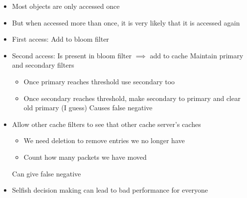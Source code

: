 \begin{itemize}
\begin{itemize}
\begin{itemize}
\begin{itemize}
\begin{itemize}
                                \end{itemize}
                        \end{itemize}
                \end{itemize}
                \begin{itemize}
                    \item Most objects are only accessed once
                    \item But when accessed more than once, it is very likely that it is accessed again
                    \item First access: Add to bloom filter
                    \item Second access: Is present in bloom filter $\implies$ add to cache
                     Maintain primary and secondary filters
                        \begin{itemize}
                            \item Once primary reaches threshold use secondary too
                            \item Once secondary reaches threshold, make secondary to primary and clear old primary (I guess)
                            \icon Causes false negative
                        \end{itemize}
                \end{itemize}
                \begin{itemize}
                    \item Allow other cache filters to see that other cache server's caches
                        \begin{itemize}
                            \item We need deletion to remove entries we no longer have
                            \item Count how many packets we have moved
                        \end{itemize}
                    \icon Can give false negative
                \end{itemize}
        \end{itemize}
        \begin{itemize}
            \item Selfish decision making can lead to bad performance for everyone
                \begin{itemize}

\end{itemize}
\end{itemize}
\end{itemize}
